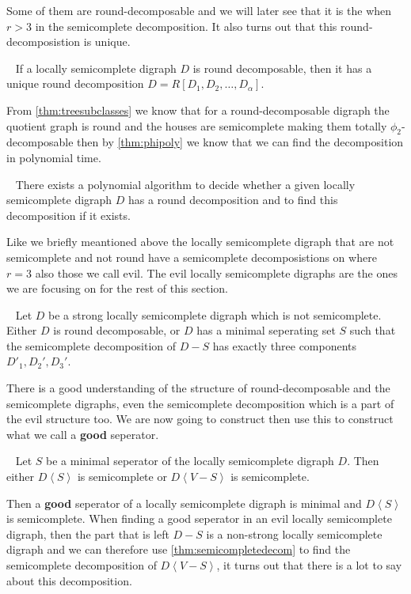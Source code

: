 Some of them are round-decomposable and we will later see that it is the when $r>3$ in the semicomplete decomposition. 
It also turns out that this round-decomposistion is unique.
\begin{cor}~\cite{bangDM167}
    If a locally semicomplete digraph $D$ is round decomposable, then it has a unique round decomposition $D=R[D_1,D_2,\dots ,D_{\alpha}]$.
\end{cor}
From \autoref{thm:treesubclasses} we know that for a round-decomposable digraph the quotient graph is round and the houses are semicomplete making them totally $\phi_2$-decomposable then by \autoref{thm:phipoly} we know that we can find the decomposition in polynomial time.
\begin{prop}~\cite{bangDM167}
    There exists a polynomial algorithm to decide whether a given locally semicomplete digraph $D$ has a round decomposition and to find this decomposition if it exists.
\end{prop}
Like we briefly meantioned above the locally semicomplete digraph that are not semicomplete and not round have a semicomplete decomposistions on where $r=3$ also those we call evil.
The evil locally semicomplete digraphs are the ones we are focusing on for the rest of this section.
\begin{lemma}~\cite{bangDM167}
    Let $D$ be a strong locally semicomplete digraph which is not semicomplete. 
    Either $D$ is round decomposable, or $D$ has a minimal seperating set $S$ such that the semicomplete decomposition of $D-S$ has exactly three components $D'_1,D_2',D_3'$.
\end{lemma}
There is a good understanding of the structure of round-decomposable and the semicomplete digraphs, even the semicomplete decomposition which is a part of the evil structure too.
We are now going to construct then use this to construct what we call a \textbf{good} seperator.
\begin{lemma}~\cite{bangJGT85}
    Let $S$ be a minimal seperator of the locally semicomplete digraph $D$. 
    Then either $D\left< S\right>$ is semicomplete or $D\left< V-S\right>$ is semicomplete.
    \label{lem:whichsemicomplete}
\end{lemma}
Then a \textbf{good} seperator of a locally semicomplete digraph is minimal and $D\left<S\right>$ is semicomplete.
When finding a good seperator in an evil locally semicomplete digraph, then the part that is left $D-S$ is a non-strong locally semicomplete digraph and we can therefore use \autoref{thm:semicompletedecom} to find the semicomplete decomposition of $D\left<V-S\right>$, it turns out that there is a lot to say about this decomposition. 

